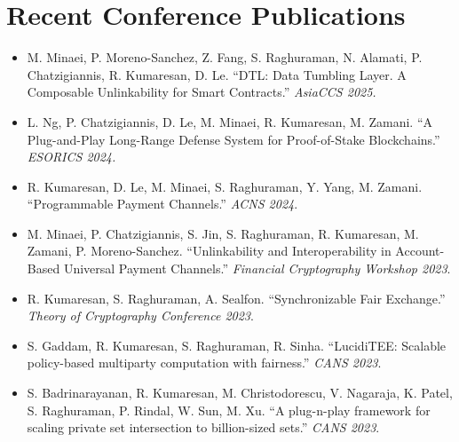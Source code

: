 \documentclass[11pt]{article}
\begin{document}
\section{Recent Conference Publications}
\begin{itemize}[leftmargin=*, noitemsep, topsep=0pt]
    \item M. Minaei, P. Moreno-Sanchez, Z. Fang, S. Raghuraman, N. Alamati, P. Chatzigiannis, R. Kumaresan, D. Le. ``DTL: Data Tumbling Layer. A Composable Unlinkability for Smart Contracts.'' \textit{AsiaCCS 2025.}
    \item L. Ng, P. Chatzigiannis, D. Le, M. Minaei, R. Kumaresan, M. Zamani. ``A Plug-and-Play Long-Range Defense System for Proof-of-Stake Blockchains.'' \textit{ESORICS 2024.}
    \item R. Kumaresan, D. Le, M. Minaei, S. Raghuraman, Y. Yang, M. Zamani. ``Programmable Payment Channels.'' \textit{ACNS 2024}.
    \item M. Minaei, P. Chatzigiannis, S. Jin, S. Raghuraman, R. Kumaresan, M. Zamani, P. Moreno-Sanchez. ``Unlinkability and Interoperability in Account-Based Universal Payment Channels.'' \textit{Financial Cryptography Workshop 2023}.
    \item R. Kumaresan, S. Raghuraman, A. Sealfon. ``Synchronizable Fair Exchange.'' \textit{Theory of Cryptography Conference 2023}.
    \item S. Gaddam, R. Kumaresan, S. Raghuraman, R. Sinha. ``LucidiTEE: Scalable policy-based multiparty computation with fairness.'' \textit{CANS 2023}.
    \item S. Badrinarayanan, R. Kumaresan, M. Christodorescu, V. Nagaraja, K. Patel, S. Raghuraman, P. Rindal, W. Sun, M. Xu. ``A plug-n-play framework for scaling private set intersection to billion-sized sets.'' \textit{CANS 2023}.
\end{itemize}
\end{document}
